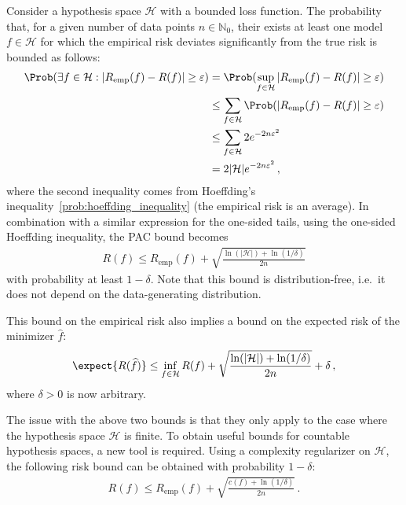     \begin{property}
        Consider a hypothesis space $\mathcal{H}$ with a bounded loss function. The probability that, for a given number of data points $n\in\mathbb{N}_0$, their exists at least one model $f\in\mathcal{H}$ for which the empirical risk deviates significantly from the true risk is bounded as follows:
        \begin{align}
            \Prob(\exists f\in\mathcal{H}:|R_{\text{emp}}(f)-R(f)|\geq\varepsilon) &= \Prob(\sup_{f\in\mathcal{H}}|R_{\text{emp}}(f)-R(f)|\geq\varepsilon)\nonumber\\
            &\leq\sum_{f\in\mathcal{H}}\Prob(|R_{\text{emp}}(f)-R(f)|\geq\varepsilon)\nonumber\\
            &\leq\sum_{f\in\mathcal{H}}2e^{-2n\varepsilon^2}\nonumber\\
            &=2|\mathcal{H}|e^{-2n\varepsilon^2}\,,
        \end{align}
        where the second inequality comes from Hoeffding's inequality~\ref{prob:hoeffding_inequality} (the empirical risk is an average). In combination with a similar expression for the one-sided tails, using the one-sided Hoeffding inequality, the PAC bound becomes
        \begin{gather}
            R(f)\leq R_{\text{emp}}(f) + \sqrt{\frac{\ln(|\mathcal{H}|)+\ln(1/\delta)}{2n}}
        \end{gather}
        with probability at least $1-\delta$. Note that this bound is distribution-free, i.e.~it does not depend on the data-generating distribution.

        This bound on the empirical risk also implies a bound on the expected risk of the minimizer $\widehat{f}$:
        \begin{gather}
            \expect{R(\widehat{f})}\leq\inf_{f\in\mathcal{H}}R(f)+\sqrt{\frac{\ln(|\mathcal{H}|)+\ln(1/\delta)}{2n}}+\delta\,,
        \end{gather}
        where $\delta>0$ is now arbitrary.
    \end{property}

    The issue with the above two bounds is that they only apply to the case where the hypothesis space $\mathcal{H}$ is finite. To obtain useful bounds for countable hypothesis spaces, a new tool is required.
    Using a complexity regularizer on $\mathcal{H}$, the following risk bound can be obtained with probability $1-\delta$:
    \begin{gather}
        R(f)\leq R_{\text{emp}}(f) + \sqrt{\frac{c(f)+\ln(1/\delta)}{2n}}\,.
    \end{gather}

